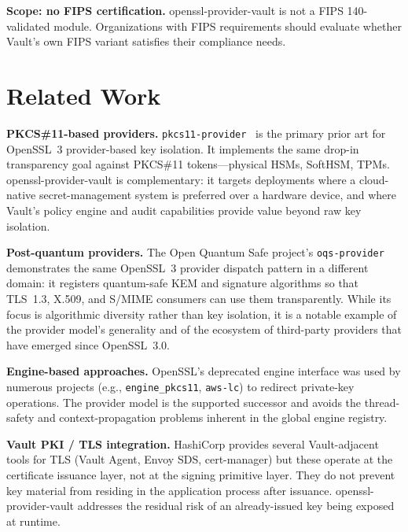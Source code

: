 \documentclass[sigconf,10pt]{acmart}
\begin{document}
\textbf{Scope: no FIPS certification.}  openssl-provider-vault is not a FIPS
140-validated module.  Organizations with FIPS requirements should evaluate
whether Vault's own FIPS variant satisfies their compliance needs.

\section{Related Work}
\label{sec:related}

\textbf{PKCS\#11-based providers.}
\texttt{pkcs11-provider}~\cite{pkcs11-provider} is the primary prior art for
OpenSSL~3 provider-based key isolation.  It implements the same drop-in
transparency goal against PKCS\#11 tokens---physical HSMs, SoftHSM, TPMs.
openssl-provider-vault is complementary: it targets deployments where a cloud-native
secret-management system is preferred over a hardware device, and where
Vault's policy engine and audit capabilities provide value beyond raw
key isolation.

\textbf{Post-quantum providers.}
The Open Quantum Safe project's \texttt{oqs-provider}~\cite{oqs-provider}
demonstrates the same OpenSSL~3 provider dispatch pattern in a different
domain: it registers quantum-safe KEM and signature algorithms so that
TLS~1.3, X.509, and S/MIME consumers can use them transparently.  While
its focus is algorithmic diversity rather than key isolation, it is a
notable example of the provider model's generality and of the ecosystem
of third-party providers that have emerged since OpenSSL~3.0.

\textbf{Engine-based approaches.}  OpenSSL's deprecated engine interface was
used by numerous projects (e.g., \texttt{engine\_pkcs11},
\texttt{aws-lc}) to redirect private-key operations.  The provider model is
the supported successor and avoids the thread-safety and context-propagation
problems inherent in the global engine registry.

\textbf{Vault PKI / TLS integration.}  HashiCorp provides several
Vault-adjacent tools for TLS (Vault Agent, Envoy SDS, cert-manager) but
these operate at the certificate issuance layer, not at the signing primitive
layer.  They do not prevent key material from residing in the application
process after issuance.  openssl-provider-vault addresses the residual risk of
an already-issued key being exposed at runtime.

\end{document}
